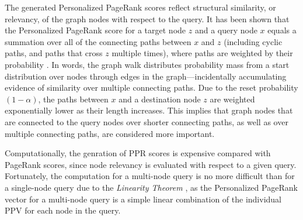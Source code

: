 \documentclass[11pt,oneside]{book}
\newcommand{\edge}[3]{{#1}\buildrel{#2}\over\longrightarrow{#3}}
\newcommand{\transition}{{\bf M}}
\begin{document}
The generated Personalized PageRank scores reflect structural
similarity, or relevancy, of the graph nodes with respect to the
query. It has been shown that the Personalized PageRank score for a
target node $z$ and a query node $x$ equals a summation over all of
the connecting paths between $x$ and $z$ (including cyclic paths, and
paths that cross $z$ multiple times), where paths are weighted by
their probability \cite{jehWWW03,fogaras05}. In words, the graph walk
distributes probability mass from a start distribution over nodes
through edges in the graph---incidentally accumulating evidence of
similarity over multiple connecting paths. Due to the reset
probability $(1- \alpha)$, the paths between $x$ and a destination
node $z$ are weighted exponentially lower as their length
increases. This implies that graph nodes that are connected to the
query nodes over shorter connecting paths, as well as over multiple
connecting paths, are considered more important.

Computationally, the genration of PPR scores is expensive compared
with PageRank scores, since node relevancy is evaluated with respect
to a given query. Fortunately, the computation for a multi-node query
is no more difficult than for a single-node query due to the
\textit{Linearity Theorem} \citep{jeh2003scaling}, as the Personalized
PageRank vector for a multi-node query is a simple linear combination
of the individual PPV for each node in the query.

\end{document}
